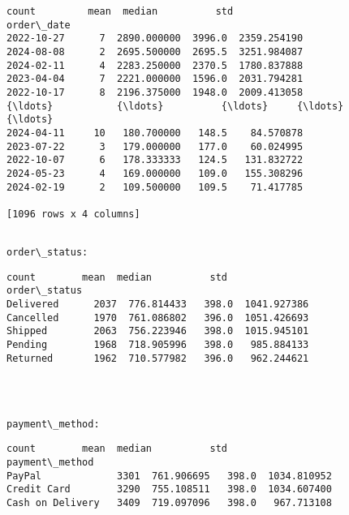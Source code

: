 \documentclass[11pt]{article}
\begin{document}
    
    \begin{Verbatim}[commandchars=\\\{\}]
            count         mean  median          std
order\_date                                         
2022-10-27      7  2890.000000  3996.0  2359.254190
2024-08-08      2  2695.500000  2695.5  3251.984087
2024-02-11      4  2283.250000  2370.5  1780.837888
2023-04-04      7  2221.000000  1596.0  2031.794281
2022-10-17      8  2196.375000  1948.0  2009.413058
{\ldots}           {\ldots}          {\ldots}     {\ldots}          {\ldots}
2024-04-11     10   180.700000   148.5    84.570878
2023-07-22      3   179.000000   177.0    60.024995
2022-10-07      6   178.333333   124.5   131.832722
2024-05-23      4   169.000000   109.0   155.308296
2024-02-19      2   109.500000   109.5    71.417785

[1096 rows x 4 columns]
    \end{Verbatim}

    
    \begin{Verbatim}[commandchars=\\\{\}]

order\_status:
    \end{Verbatim}

    
    \begin{Verbatim}[commandchars=\\\{\}]
              count        mean  median          std
order\_status                                        
Delivered      2037  776.814433   398.0  1041.927386
Cancelled      1970  761.086802   396.0  1051.426693
Shipped        2063  756.223946   398.0  1015.945101
Pending        1968  718.905996   398.0   985.884133
Returned       1962  710.577982   396.0   962.244621
    \end{Verbatim}

    
    \begin{center}
    \end{center}
    { \hspace*{\fill} \\}
    
    \begin{Verbatim}[commandchars=\\\{\}]

payment\_method:
    \end{Verbatim}

    
    \begin{Verbatim}[commandchars=\\\{\}]
                  count        mean  median          std
payment\_method                                          
PayPal             3301  761.906695   398.0  1034.810952
Credit Card        3290  755.108511   398.0  1034.607400
Cash on Delivery   3409  719.097096   398.0   967.713108
    \end{Verbatim}
\end{document}

